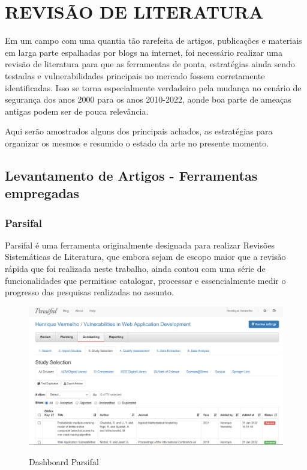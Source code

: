 \chapter{REVISÃO DE LITERATURA}
\label{chp:capitulo2}

Em um campo com uma quantia tão rarefeita de artigos, publicações e materiais em larga parte espalhadas por blogs na internet, foi necessário realizar uma revisão de literatura para que as ferramentas de ponta, estratégias ainda sendo testadas e vulnerabilidades principais no mercado fossem corretamente identificadas. Isso se torna especialmente verdadeiro pela mudança no cenário de segurança dos anos 2000 para os anos 2010-2022, aonde boa parte de ameaças antigas podem ser de pouca relevância.

Aqui serão amostrados alguns dos principais achados, as estratégias para organizar os mesmos e resumido o estado da arte no presente momento.

\section{Levantamento de Artigos - Ferramentas empregadas}
\subsection{Parsifal}
Parsifal é uma ferramenta originalmente designada para realizar Revisões Sistemáticas de Literatura, que embora sejam de escopo maior que a revisão rápida que foi realizada neste trabalho, ainda contou com uma série de funcionalidades que permitisse catalogar, processar e essencialmente medir o progresso das pesquisas realizadas no assunto.

\begin{figure}[ht]
    \centering
    \caption{Dashboard Parsifal}
    \includegraphics[width=16cm]{figuras/parsifal.png} 
    \label{fig:internet} 
\end{figure}

